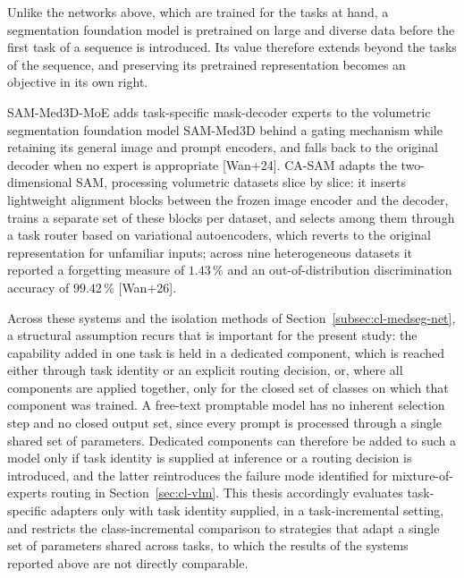 Unlike the networks above, which are trained for the tasks at hand, a segmentation foundation model is pretrained on large and diverse data before the first task of a sequence is introduced. Its value therefore extends beyond the tasks of the sequence, and preserving its pretrained representation becomes an objective in its own right.

SAM-Med3D-MoE adds task-specific mask-decoder experts to the volumetric segmentation foundation model SAM-Med3D behind a gating mechanism while retaining its general image and prompt encoders, and falls back to the original decoder when no expert is appropriate [Wan+24]. CA-SAM adapts the two-dimensional SAM, processing volumetric datasets slice by slice: it inserts lightweight alignment blocks between the frozen image encoder and the decoder, trains a separate set of these blocks per dataset, and selects among them through a task router based on variational autoencoders, which reverts to the original representation for unfamiliar inputs; across nine heterogeneous datasets it reported a forgetting measure of $1.43\,\%$ and an out-of-distribution discrimination accuracy of $99.42\,\%$ [Wan+26].

Across these systems and the isolation methods of Section~\ref{subsec:cl-medseg-net}, a structural assumption recurs that is important for the present study: the capability added in one task is held in a dedicated component, which is reached either through task identity or an explicit routing decision, or, where all components are applied together, only for the closed set of classes on which that component was trained. A free-text promptable model has no inherent selection step and no closed output set, since every prompt is processed through a single shared set of parameters. Dedicated components can therefore be added to such a model only if task identity is supplied at inference or a routing decision is introduced, and the latter reintroduces the failure mode identified for mixture-of-experts routing in Section~\ref{sec:cl-vlm}. This thesis accordingly evaluates task-specific adapters only with task identity supplied, in a task-incremental setting, and restricts the class-incremental comparison to strategies that adapt a single set of parameters shared across tasks, to which the results of the systems reported above are not directly comparable.

